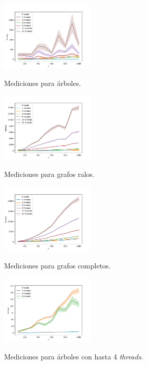 \newpage

\begin{figure}[h]
\caption{Mediciones para árboles.}
\centering
\includegraphics[width=0.4\textwidth]{imagenes/arbol.png} \\%
\label{fig:arboles}
\end{figure}

\begin{figure}[h]
\caption{Mediciones para grafos ralos.}
\centering
\includegraphics[width=0.4\textwidth]{imagenes/ralo.png} \\%
\label{fig:ralos}
\end{figure}

\begin{figure}[h]
\caption{Mediciones para grafos completos.}
\centering
\includegraphics[width=0.4\textwidth]{imagenes/completo.png} \\%
\label{fig:completos}
\end{figure}

\newpage

\begin{figure}[h]
\caption{Mediciones para árboles con hasta 4 \textit{threads}.}
\centering
\includegraphics[width=0.4\textwidth]{imagenes/arbol-124.png} \\
\label{fig:arboles124}
\end{figure}

